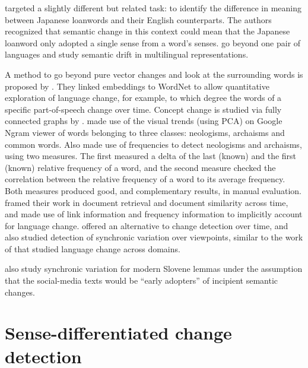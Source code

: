 \documentclass[output=paper]{langsci/langscibook}
\begin{document}
 
 \citet{japnloanwords} targeted a slightly different but related task: to identify the difference in meaning between Japanese loanwords and their English counterparts.  
 The authors recognized that semantic change in this context could mean that the Japanese loanword only adopted a single sense from a word's senses. \citet{cognatesuban:beinborn2019semantic} go beyond one pair of languages and study semantic drift in multilingual representations.  
 

 
 
	A method to go beyond pure vector changes and look at the surrounding words is proposed by  \citet{vanaggelen}. They linked embeddings to WordNet to allow quantitative exploration of language change, for example, to which degree the words of a specific part-of-speech change over time. Concept change is studied via fully connected graphs by \citet{recchia2016tracing}. 
\citet{chiru-2014} made use of the visual trends (using PCA) on Google Ngram viewer of words belonging to three classes: neologisms, archaisms and common words. 
Also \citet{tjongkimsang} made use of frequencies to detect neologisms and archaisms, using two measures. The first measured a delta of the last (known) and the first (known) relative frequency of a word, and the second measure checked the correlation between the relative frequency of a word to its average frequency. Both measures produced good, and complementary results, in manual evaluation.
\citet{morsy2016accounting} framed their work in document retrieval and document similarity across time, and made use of link information and frequency information to implicitly account for language change. 
 \citet{wordsaremalleable} offered an alternative to change detection over time, and also studied detection of synchronic variation over viewpoints, similar to the work of \citet{schlechtweg-etal-2019-wind} that studied language change across domains.

\begin{sloppypar}
 \citet{fiser-ljubesic-2018} also study synchronic variation for modern Slovene lemmas under the assumption that the social-media texts would be ``early adopters'' of incipient semantic changes.\end{sloppypar}
 
 
\section{Sense-differentiated change detection}\label{sec:sdcd}
        
\end{document}
